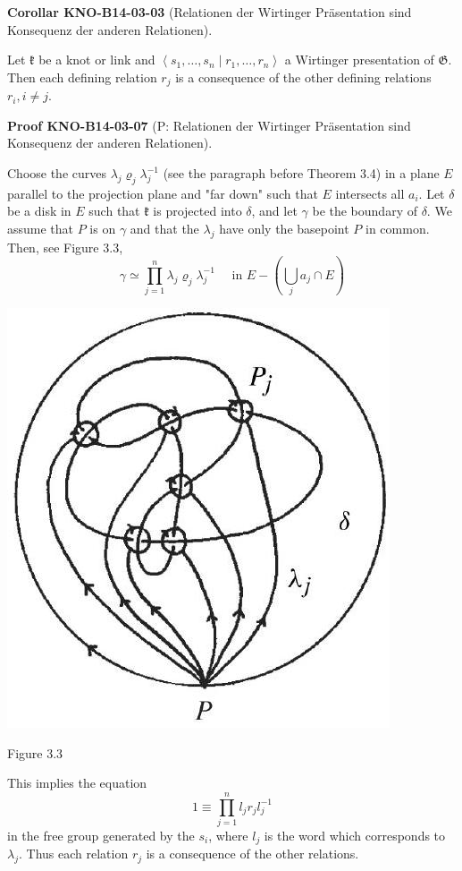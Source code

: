 \documentclass[10pt, letterpaper]{article}
\newcommand{\CustomHeading}[3]{%
  \par\medskip\noindent%
  \textbf{#1 #2} \textnormal{(#3)}.\enskip%
}
\newenvironment{KORO}[2]{\CustomHeading{Corollar}{#1}{#2}}{}
\newenvironment{PROOF}[2]{\CustomHeading{Proof}{#1}{#2}}{}
\begin{document}
\begin{KORO}{KNO-B14-03-03}{Relationen der Wirtinger Präsentation sind Konsequenz der anderen Relationen}
Let $\mathfrak{k}$ be a knot or link and $\left\langle s_{1}, \ldots, s_{n} \mid r_{1}, \ldots, r_{n}\right\rangle$ a Wirtinger presentation of $\mathfrak{G}$. Then each defining relation $r_{j}$ is a consequence of the other defining relations $r_{i}, i \neq j$.
\end{KORO}

\begin{PROOF}{KNO-B14-03-07}{P: Relationen der Wirtinger Präsentation sind Konsequenz der anderen Relationen}
Choose the curves $\lambda_{j} \varrho_{j} \lambda_{j}^{-1}$ (see the paragraph before Theorem 3.4) in a plane $E$ parallel to the projection plane and "far down" such that $E$ intersects all $a_{i}$. Let $\delta$ be a disk in $E$ such that $\mathfrak{k}$ is projected into $\delta$, and let $\gamma$ be the boundary of $\delta$. We assume that $P$ is on $\gamma$ and that the $\lambda_{j}$ have only the basepoint $P$ in common. Then, see Figure 3.3,
$$
\gamma \simeq \prod_{j=1}^{n} \lambda_{j} \varrho_{j} \lambda_{j}^{-1} \quad \text { in } E-\left(\bigcup_{j} a_{j} \cap E\right)
$$
\begin{center}
\includegraphics[scale=0.2]{2025_05_21_9c06be8de7a55410f8c1g-049}
\end{center}
Figure 3.3

This implies the equation
$$
1 \equiv \prod_{j=1}^{n} l_{j} r_{j} l_{j}^{-1}
$$
in the free group generated by the $s_{i}$, where $l_{j}$ is the word which corresponds to $\lambda_{j}$. Thus each relation $r_{j}$ is a consequence of the other relations.
\end{PROOF}
\end{document}
